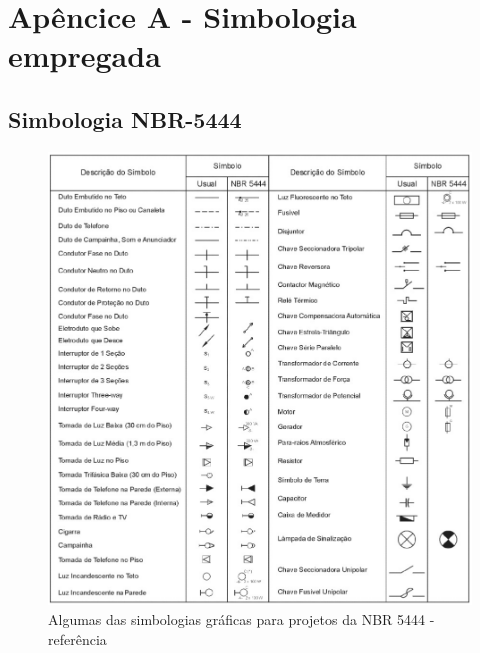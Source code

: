 \section{Apêncice A - Simbologia empregada} \label{section: anexo A simbologia}

\subsection{Simbologia NBR-5444}\label{subsection: simbologia NBR5444}
	\begin{figure}[H]
		\centering
		\includegraphics[width=\textwidth]{Figures/5. Symbology/NBR 5444.png}
		\caption{Algumas das simbologias gráficas para projetos da NBR 5444 - referência \cite{filho2017instalacoes}}
		\label{fig: simbologia nbr5444}
	\end{figure}

\newpage

